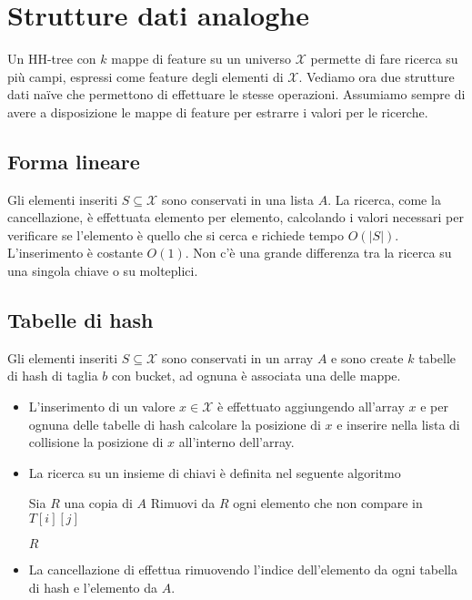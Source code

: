 \documentclass[a4paper]{article}
\begin{document}
\section{Strutture dati analoghe}

Un HH-tree con $k$ mappe di feature su un universo $\mathcal{X}$ permette di fare ricerca su più campi, espressi come feature degli elementi di $\mathcal{X}$. Vediamo ora due strutture dati naïve che permettono di effettuare le stesse operazioni. Assumiamo sempre di avere a disposizione le mappe di feature per estrarre i valori per le ricerche.

\subsection{Forma lineare}

Gli elementi inseriti $S \subseteq \mathcal{X}$ sono conservati in una lista $A$. La ricerca, come la cancellazione, è effettuata elemento per elemento, calcolando i valori necessari per verificare se l'elemento è quello che si cerca e richiede tempo $O(|S|)$. L'inserimento è costante $O(1)$. Non c'è una grande differenza tra la ricerca su una singola chiave o su molteplici.

\subsection{Tabelle di hash}

Gli elementi inseriti $S \subseteq \mathcal{X}$ sono conservati in un array $A$ e sono create $k$ tabelle di hash di taglia $b$ con bucket, ad ognuna è associata una delle mappe.
\begin{itemize}
	\item L'inserimento di un valore $x \in \mathcal{X}$ è effettuato aggiungendo all'array $x$ e per ognuna delle tabelle di hash calcolare la posizione di $x$ e inserire nella lista di collisione la posizione di $x$ all'interno dell'array.
	\item La ricerca su un insieme di chiavi è definita nel seguente algoritmo
	\begin{algorithm}
		\DontPrintSemicolon \;


		Sia $R$ una copia di $A$ \;
		 {
			 {
				Rimuovi da $R$ ogni elemento che non compare in $T[i][j]$ \;
			}
		}

		\Return $R$ \; \;
	\end{algorithm}
	\item La cancellazione di effettua rimuovendo l'indice dell'elemento da ogni tabella di hash e l'elemento da $A$.
\end{itemize}
\end{document}
